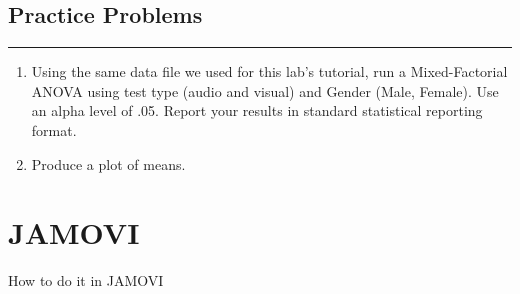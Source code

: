\documentclass[]{book}
\begin{document}
\subsection{Practice Problems}\label{practice-problems-10}

\begin{center}\rule{0.5\linewidth}{0.5pt}\end{center}

\begin{enumerate}
\def\labelenumi{\arabic{enumi}.}
\item
  Using the same data file we used for this lab's tutorial, run a
  Mixed-Factorial ANOVA using test type (audio and visual) and Gender
  (Male, Female). Use an alpha level of .05. Report your results in
  standard statistical reporting format.
\item
  Produce a plot of means.
\end{enumerate}

\section{JAMOVI}\label{jamovi-11}

How to do it in JAMOVI


\end{document}
